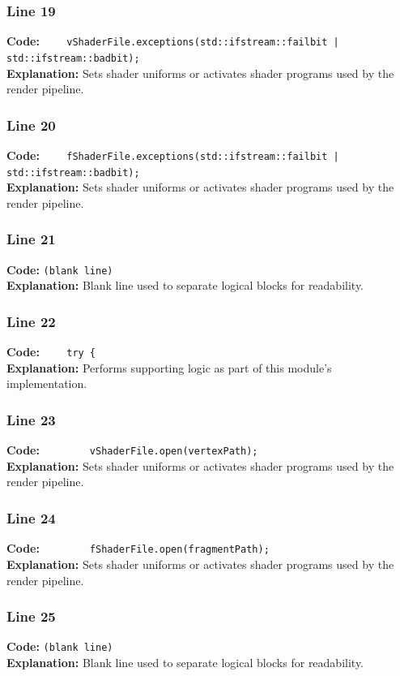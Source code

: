 \documentclass[11pt,a4paper]{article}
\begin{document}
\subsubsection*{Line 19}
\textbf{Code:} \verb!    vShaderFile.exceptions(std::ifstream::failbit | std::ifstream::badbit);!\\
\textbf{Explanation:} Sets shader uniforms or activates shader programs used by the render pipeline.

\subsubsection*{Line 20}
\textbf{Code:} \verb!    fShaderFile.exceptions(std::ifstream::failbit | std::ifstream::badbit);!\\
\textbf{Explanation:} Sets shader uniforms or activates shader programs used by the render pipeline.

\subsubsection*{Line 21}
\textbf{Code:} \texttt{(blank line)}\\
\textbf{Explanation:} Blank line used to separate logical blocks for readability.

\subsubsection*{Line 22}
\textbf{Code:} \verb|    try {|\\
\textbf{Explanation:} Performs supporting logic as part of this module's implementation.

\subsubsection*{Line 23}
\textbf{Code:} \verb|        vShaderFile.open(vertexPath);|\\
\textbf{Explanation:} Sets shader uniforms or activates shader programs used by the render pipeline.

\subsubsection*{Line 24}
\textbf{Code:} \verb|        fShaderFile.open(fragmentPath);|\\
\textbf{Explanation:} Sets shader uniforms or activates shader programs used by the render pipeline.

\subsubsection*{Line 25}
\textbf{Code:} \texttt{(blank line)}\\
\textbf{Explanation:} Blank line used to separate logical blocks for readability.
\end{document}
